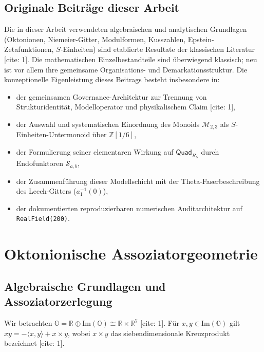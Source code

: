 \documentclass[11pt,a4paper]{article}
\newcommand{\Oalg}{\mathbb{O}}
\newcommand{\ImO}{\mathrm{Im}(\mathbb{O})}
\begin{document}
	\subsection*{Originale Beiträge dieser Arbeit}
	Die in dieser Arbeit verwendeten algebraischen und analytischen Grundlagen (Oktonionen, Niemeier-Gitter, Modulformen, Kusszahlen, Epstein-Zetafunktionen, $S$-Einheiten) sind etablierte Resultate der klassischen Literatur \cite{baez, conway, serre, cassels, weil, ebeling}[cite: 1]. Die mathematischen Einzelbestandteile sind überwiegend klassisch; neu ist vor allem ihre gemeinsame Organisations- und Demarkationsstruktur. Die konzeptionelle Eigenleistung dieses Beitrags besteht insbesondere in:
	\begin{itemize}
		\item der gemeinsamen Governance-Architektur zur Trennung von Strukturidentität, Modelloperator und physikalischem Claim \cite{eabcAudit}[cite: 1],
		\item der Auswahl und systematischen Einordnung des Monoids $\mathcal{M}_{2,3}$ als $S$-Einheiten-Untermonoid über $\mathbb{Z}[1/6]$,
		\item der Formulierung seiner elementaren Wirkung auf $\mathsf{Quad}_{R_S}$ durch Endofunktoren $\mathscr{S}_{a,b}$,
		\item der Zusammenführung dieser Modellschicht mit der Theta-Faserbeschreibung des Leech-Gitters ($a_1^{-1}(0)$),
		\item der dokumentierten reproduzierbaren numerischen Auditarchitektur auf \texttt{RealField(200)}.
	\end{itemize}
	
	\section{Oktonionische Assoziatorgeometrie}
	
	\subsection{Algebraische Grundlagen und Assoziatorzerlegung}
	
	Wir betrachten $\Oalg = \mathbb{R} \oplus \ImO \cong \mathbb{R} \times \mathbb{R}^7$ \cite{baez}[cite: 1]. Für $x,y \in \ImO$ gilt $xy = -\langle x,y\rangle + x \times y$, wobei $x \times y$ das siebendimensionale Kreuzprodukt bezeichnet \cite{harvey}[cite: 1].
	
\end{document}
